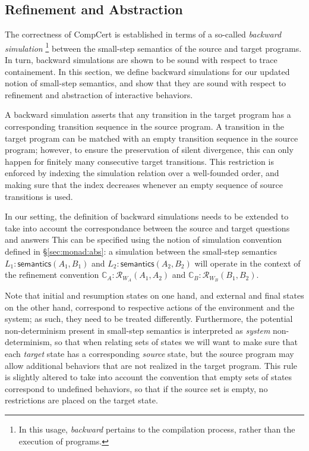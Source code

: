 \documentclass[acmsmall,timestamp,review,anonymous]{acmart}
\newcommand{\kw}[1]{\ensuremath{ \mathsf{#1} }}
\begin{document}

\subsection{Refinement and Abstraction} \label{sec:modsem:sim} %
\label{sec:modsem:ref}

The correctness of CompCert is established in terms of
a so-called \emph{backward simulation}%
\footnote{In this usage, \emph{backward} pertains to
  the compilation process,
  rather than the execution of programs.}
between the small-step semantics of the source and target programs.
In turn, backward simulations
are shown to be sound with respect to trace containement.
In this section,
we define backward simulations for our updated notion
of small-step semantics,
and show that they are sound with respect to
refinement and abstraction of interactive behaviors.

A backward simulation asserts that any transition in the target program
has a corresponding transition sequence in the source program.
A transition in the target program can be matched with
an empty transition sequence in the source program;
however, to ensure the preservation of silent divergence,
this can only happen for finitely many consecutive target transitions.
This restriction is enforced by indexing the simulation relation
over a well-founded order,
and making sure that the index decreases
whenever an empty sequence of source transitions is used.

In our setting,
the definition of backward simulations needs to be extended
to take into account the correspondance between
the source and target questions and answers
This can be specified using the notion of simulation convention
defined in \S\ref{sec:monad:abs}:
a simulation between the small-step semantics
$L_1 : \kw{semantics}(A_1, B_1)$ and
$L_2 : \kw{semantics}(A_2, B_2)$ will
operate in the context of the refinement convention
$\mathbb{C}_A : \mathcal{R}_{W_A}(A_1, A_2)$ and
$\mathbb{C}_B : \mathcal{R}_{W_B}(B_1, B_2)$.

Note that initial and resumption states on one hand,
and external and final states on the other hand,
correspond to respective actions of the environment and the system;
as such, they need to be treated differently.
Furthermore,
the potential non-determinism present in small-step semantics
is interpreted as \emph{system} non-determinism,
so that when relating sets of states
we will want to make sure that
each \emph{target} state has a corresponding \emph{source} state,
but the source program may allow additional behaviors
that are not realized in the target program.
This rule is slightly altered to take into account the convention that
empty sets of states correspond to undefined behaviors,
so that if the source set is empty,
no restrictions are placed on the target state.
\end{document}
